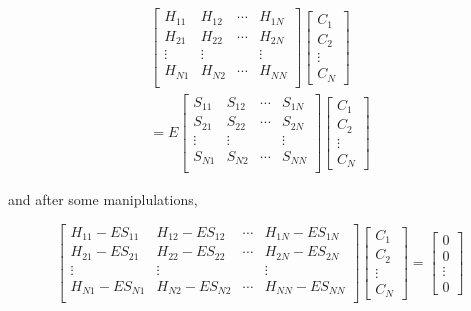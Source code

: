 \documentclass[a4paper, 12pt, titlepage,oneside,drop]{kthesis}
\begin{document}
\begin{equation}\begin{split}\label{ep4}
\left[
\begin{matrix}
    H_{11} & H_{12} & \cdots & H_{1N} \\
    H_{21} & H_{22} & \cdots & H_{2N} \\
    \vdots               & \vdots               &        & \vdots               \\
     H_{N1} & H_{N2} & \cdots & H_{NN} \\
\end{matrix} \right] \left[ \begin{array}{c} C_1 \\ C_2 \\ \vdots \\ C_N\end{array} \right] \\
=E \left[
\begin{matrix}
    S_{11} & S_{12} & \cdots & S_{1N} \\
    S_{21} & S_{22} & \cdots & S_{2N} \\
    \vdots               & \vdots               &        & \vdots               \\
     S_{N1} & S_{N2} & \cdots & S_{NN} \\
\end{matrix} \right]\left[ \begin{array}{c} C_1 \\ C_2 \\ \vdots \\ C_N\end{array} \right]
\end{split}\end{equation}

\noindent and after some maniplulations, 

\begin{equation}\label{ep44}
\left[
\begin{matrix}
    H_{11} - E S_{11} & H_{12} - E S_{12} & \cdots & H_{1N} - E S_{1N} \\
   H_{21} - E S_{21} & H_{22} - E S_{22} & \cdots & H_{2N} - E S_{2N} \\
    \vdots               & \vdots               &        & \vdots               \\
  H_{N1} - E S_{N1} & H_{N2} - E S_{N2} & \cdots & H_{NN} - E S_{NN} \\
\end{matrix} \right] \left[ \begin{array}{c} C_1 \\ C_2 \\ \vdots \\ C_N\end{array} \right]
=\left[ \begin{array}{c} 0 \\ 0 \\ \vdots \\ 0 \end{array} \right]
\end{equation}
\end{document}
